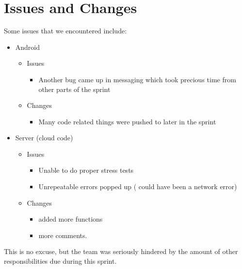 \documentclass[11pt]{article}
\begin{document}
\section*{Issues and Changes}
Some issues that we encountered include:

	\begin{itemize}
		\item Android
			\begin{itemize}
				\item Issues
				\begin{itemize}
					\item Another bug came up in messaging which took precious time from other parts of the sprint
				\end{itemize}
				
				\item Changes
				\begin{itemize}
					\item Many code related things were pushed to later in the sprint
				\end{itemize}
			\end{itemize}
			
		\item Server (cloud code)
		\begin{itemize}
				\item Issues
				\begin{itemize}
					\item Unable to do proper stress tests
					\item Unrepeatable errors popped up ( could have been a network error)		
				\end{itemize}
				
				\item Changes 
				\begin{itemize}
					\item added more functions
					\item more comments.
				\end{itemize}
			\end{itemize}
	\end{itemize}
	This is no excuse, but the team was seriously hindered by the amount of other responsibilities due during this sprint.\\
\end{document}
